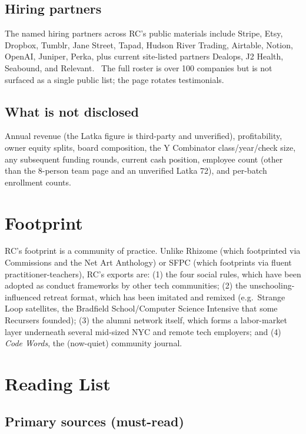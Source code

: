\documentclass[10pt,letterpaper,twocolumn]{article}
\begin{document}
\subsection{Hiring partners}

The named hiring partners across RC's public materials include Stripe, Etsy, Dropbox, Tumblr, Jane Street, Tapad, Hudson River Trading, Airtable, Notion, OpenAI, Juniper, Perka, plus current site-listed partners Dealops, J2 Health, Seabound, and Relevant.~\citep{wikipediarc,rchirepage,rcdropboxetsyetc} The full roster is over 100 companies but is not surfaced as a single public list; the page rotates testimonials.

\subsection{What is not disclosed}

Annual revenue (the Latka figure is third-party and unverified), profitability, owner equity splits, board composition, the Y Combinator class/year/check size, any subsequent funding rounds, current cash position, employee count (other than the 8-person team page and an unverified Latka 72), and per-batch enrollment counts.

\section{Footprint}

RC's footprint is a community of practice. Unlike Rhizome (which footprinted via Commissions and the Net Art Anthology) or SFPC (which footprints via fluent practitioner-teachers), RC's exports are: (1) the four social rules, which have been adopted as conduct frameworks by other tech communities; (2) the unschooling-influenced retreat format, which has been imitated and remixed (e.g.\ Strange Loop satellites, the Bradfield School/Computer Science Intensive that some Recursers founded); (3) the alumni network itself, which forms a labor-market layer underneath several mid-sized NYC and remote tech employers; and (4) \emph{Code Words}, the (now-quiet) community journal.

\section{Reading List}

\subsection{Primary sources (must-read)}
\end{document}
